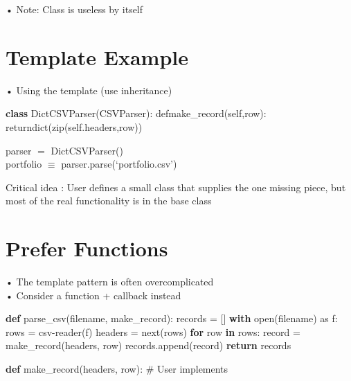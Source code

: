 \documentclass[
  letterpaper,
  DIV=11,
  numbers=noendperiod]{scrreprt}
\newenvironment{Shaded}{\begin{snugshade}}{\end{snugshade}}
\newcommand{\BuiltInTok}[1]{\textcolor[rgb]{0.00,0.23,0.31}{#1}}
\newcommand{\CommentTok}[1]{\textcolor[rgb]{0.37,0.37,0.37}{#1}}
\newcommand{\ControlFlowTok}[1]{\textcolor[rgb]{0.00,0.23,0.31}{\textbf{#1}}}
\newcommand{\ImportTok}[1]{\textcolor[rgb]{0.00,0.46,0.62}{#1}}
\newcommand{\KeywordTok}[1]{\textcolor[rgb]{0.00,0.23,0.31}{\textbf{#1}}}
\newcommand{\NormalTok}[1]{\textcolor[rgb]{0.00,0.23,0.31}{#1}}
\newcommand{\OperatorTok}[1]{\textcolor[rgb]{0.37,0.37,0.37}{#1}}
\newcommand{\VariableTok}[1]{\textcolor[rgb]{0.07,0.07,0.07}{#1}}
\begin{document}
• Note: Class is useless by itself


\chapter{Template Example}\label{template-example-1}

• Using the template (use inheritance)

\begin{Shaded}
\begin{Highlighting}[]
\KeywordTok{class}\NormalTok{ DictCSVParser(CSVParser): defmake\_record(}\VariableTok{self}\NormalTok{,row): returndict(}\BuiltInTok{zip}\NormalTok{(}\VariableTok{self}\NormalTok{.headers,row)) }
\end{Highlighting}
\end{Shaded}

parser \(=\) DictCSVParser()\\
portfolio \(\equiv\) parser.parse(`portfolio.csv')

Critical idea : User defines a small class that supplies the one missing
piece, but most of the real functionality is in the base class


\chapter{Prefer Functions}\label{prefer-functions}

• The template pattern is often overcomplicated\\
• Consider a function + callback instead

\begin{Shaded}
\begin{Highlighting}[]
\KeywordTok{def}\NormalTok{ parse\_csv(filename, make\_record): records }\OperatorTok{=}\NormalTok{ [] }\ControlFlowTok{with} \BuiltInTok{open}\NormalTok{(filename) }\ImportTok{as}\NormalTok{ f: rows }\OperatorTok{=}\NormalTok{ csv}\OperatorTok{{-}}\NormalTok{reader(f) headers }\OperatorTok{=} \BuiltInTok{next}\NormalTok{(rows) }\ControlFlowTok{for}\NormalTok{ row }\KeywordTok{in}\NormalTok{ rows: record }\OperatorTok{=}\NormalTok{ make\_record(headers, row) records.append(record) }\ControlFlowTok{return}\NormalTok{ records }
\end{Highlighting}
\end{Shaded}

\begin{Shaded}
\begin{Highlighting}[]
\KeywordTok{def}\NormalTok{ make\_record(headers, row):}
    \CommentTok{\# User implements }
\end{Highlighting}
\end{Shaded}
\end{document}
